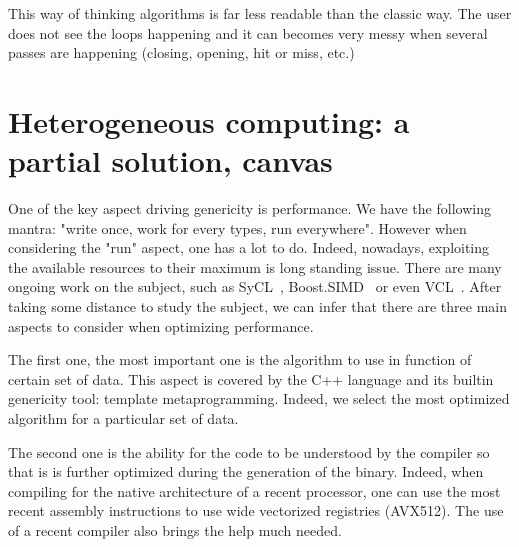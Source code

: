 This way of thinking algorithms is far less readable than the classic way. The user does not see the loops happening and
it can becomes very messy when several passes are happening (closing, opening, hit or miss, etc.)

\vspace{1cm}


\section{Heterogeneous computing: a partial solution, canvas}
\label{sec.hc.canvas}

One of the key aspect driving genericity is performance. We have the following mantra: "write once, work for every
types, run everywhere". However when considering the "run" aspect, one has a lot to do. Indeed, nowadays, exploiting the
available resources to their maximum is long standing issue. There are many ongoing work on the subject, such as
SyCL~\cite{brown.2019.heterogeneous,wong.2019.heterogeneous}, Boost.SIMD~\cite{esterie.2014.boostsimd} or even
VCL~\cite{fog.2013.vcl}. After taking some distance to study the subject, we can infer that there are three main aspects
to consider when optimizing performance.

The first one, the most important one is the algorithm to use in function of certain set of data. This aspect is covered
by the C++ language and its builtin genericity tool: template metaprogramming. Indeed, we select the most optimized
algorithm for a particular set of data.

The second one is the ability for the code to be understood by the compiler so that is is further optimized during the
generation of the binary. Indeed, when compiling for the native architecture of a recent processor, one can use the most
recent assembly instructions to use wide vectorized registries (AVX512). The use of a recent compiler also brings the
help much needed.


